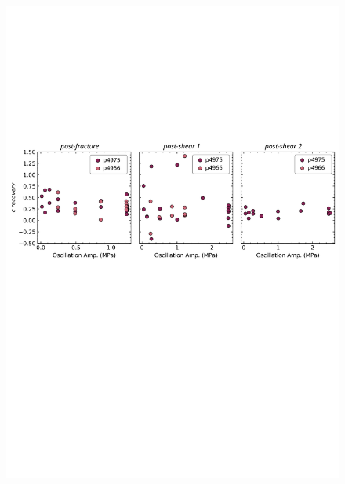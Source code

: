 \documentclass[letterpaper,10pt]{article}
\begin{document}
\begin{figure}[ht]
	\centering
	\includegraphics[width=1\columnwidth]{Cdot_NS_amp}

\end{figure}
\end{document}
